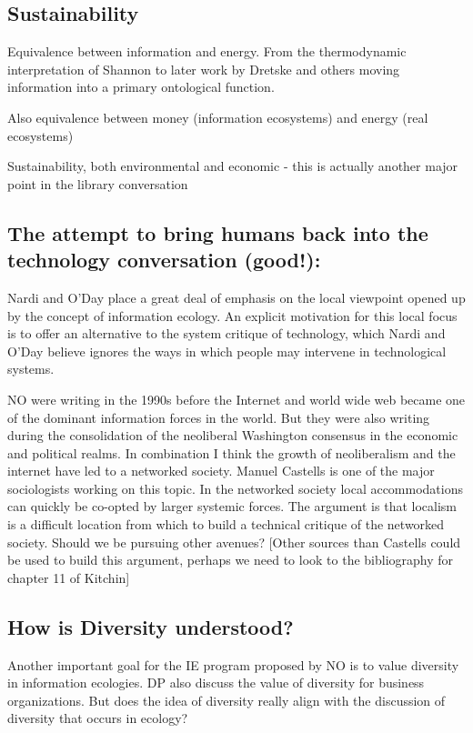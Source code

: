 \subsection{Sustainability}

Equivalence between information and energy. From the thermodynamic interpretation of Shannon to later work by Dretske and others moving information into a primary ontological function.

Also equivalence between money (information ecosystems) and energy (real ecosystems)

Sustainability, both environmental and economic - this is actually another major point in the library conversation

\subsection{The attempt to bring humans back into the technology conversation (good!):}

Nardi and O'Day place a great deal of emphasis on the local viewpoint opened up by the concept of information ecology. An explicit motivation for this local focus is to offer an alternative to the system critique of technology, which Nardi and O'Day believe ignores the ways in which people may intervene in technological systems.

NO were writing in the 1990s before the Internet and world wide web became one of the dominant information forces in the world. But they were also writing during the consolidation of the neoliberal Washington consensus in the economic and political realms. In combination I think the growth of neoliberalism and the internet have led to a networked society. Manuel Castells is one of the major sociologists working on this topic. In the networked society local accommodations can quickly be co-opted by larger systemic forces. The argument is that localism is a difficult location from which to build a technical critique of the networked society. Should we be pursuing other avenues? [Other sources than Castells could be used to build this argument, perhaps we need to look to the bibliography for chapter 11 of Kitchin]

\subsection{How is Diversity understood?}

Another important goal for the IE program proposed by NO is to value diversity in information ecologies. DP also discuss the value of diversity for business organizations. But does the idea of diversity really align with the discussion of diversity that occurs in ecology?

